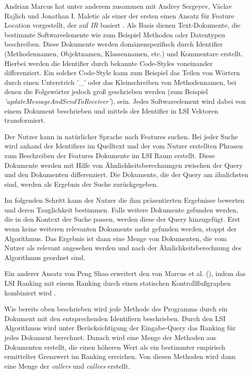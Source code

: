\documentclass[runningheads,a4paper]{llncs}
\begin{document}
Andrian Marcus hat unter anderem zusammen mit Andrey Sergeyev, Václav \mbox{Rajlich} und Jonathan I. Maletic als einer der ersten einen Ansatz für Feature Location vorgestellt, der auf \textit{\ac{IR}} basiert \cite{marcus1}\cite{marcus2}. Als Basis dienen Text-Dokumente, die bestimmte Softwareelemente wie zum Beispiel Methoden oder Datentypen beschreiben. Diese Dokumente werden domänenspezifisch durch Identifier (Methodennamen, Objektnamen, Klassennamen, etc.) und Kommentare erstellt. Hierbei werden die Identifier durch bekannte Code-Styles voneinander differenziert. Ein solcher Code-Style kann zum Beispiel das Teilen von Wörtern durch einen Unterstrich '\_' oder das Kleinschreiben von Methodennamen, bei denen die Folgewörter jedoch groß geschrieben werden (zum Beispiel \textit{'updateMessageAndSendToReceiver'}), sein. Jedes Softwareelement wird dabei von einem Dokument beschrieben und mittels der Identifier in \ac{LSI} Vektoren transformiert.

Der Nutzer kann in natürlicher Sprache nach Features suchen. Bei jeder Suche wird anhand der Identifiers im Quelltext und der vom Nutzer erstellten Phrasen zum Beschreiben der Features Dokumente im \ac{LSI} Raum erstellt. Diese Dokumente werden mit Hilfe von Ähnlichkeitsberechnungen zwischen der Query und den Dokumenten differenziert. Die Dokumente, die der Query am ähnlichsten sind, werden als Ergebnis der Suche zurückgegeben.

Im folgenden Schritt kann der Nutzer die ihm präsentierten Ergebnisse bewerten und deren Tauglichkeit bestimmen. Falls weitere Dokumente gefunden werden, die in den Kontext der Suche passen, werden diese der Query hinzugefügt. Erst wenn keine weiteren relevanten Dokumente mehr gefunden werden, stoppt der Algorithmus. Das Ergebnis ist dann eine Menge von Dokumenten, die vom Nutzer als relevant angesehen werden und nach der Ähnlichkeitsberechnung des Algorithmus geordnet sind.

Ein anderer Ansatz von Peng Shao erweitert den von Marcus et al. (\cite{marcus1}\cite{marcus2}), indem das \ac{LSI} Ranking mit einem Ranking durch einen statischen Kontrollflußgraphen kombiniert wird \cite{shao}.

Wie bereits oben beschrieben wird jede Methode des Programms durch ein Dokument mit den entsprechenden Identifiern beschrieben. Durch den \ac{LSI} Algorithmus wird unter Berücksichtigung der Eingabe-Query das Ranking für jedes Dokument berechnet. Danach wird eine Menge der Methoden aus Dokumenten erstellt, die einen höheren Wert als ein bestimmter empirisch ermittelter Grenzwert im Ranking erreichen. Von diesen Methoden wird dann eine Menge der \textit{callers} und \textit{callees} erstellt.
\end{document}
